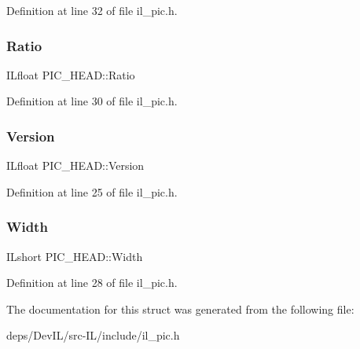 Definition at line 32 of file il\+\_\+pic.\+h.

\mbox{\label{structPIC__HEAD_a7a652ad020d931f870440df402b4ff13}} 
\subsubsection{\texorpdfstring{Ratio}{Ratio}}
{\footnotesize\ttfamily I\+Lfloat P\+I\+C\+\_\+\+H\+E\+A\+D\+::\+Ratio}



Definition at line 30 of file il\+\_\+pic.\+h.

\mbox{\label{structPIC__HEAD_a96bec33e36f9af928b4fd6b42a503637}} 
\subsubsection{\texorpdfstring{Version}{Version}}
{\footnotesize\ttfamily I\+Lfloat P\+I\+C\+\_\+\+H\+E\+A\+D\+::\+Version}



Definition at line 25 of file il\+\_\+pic.\+h.

\mbox{\label{structPIC__HEAD_af30a99863cc47a4923a7e6ee70f8ffc4}} 
\subsubsection{\texorpdfstring{Width}{Width}}
{\footnotesize\ttfamily I\+Lshort P\+I\+C\+\_\+\+H\+E\+A\+D\+::\+Width}



Definition at line 28 of file il\+\_\+pic.\+h.



The documentation for this struct was generated from the following file\+:\begin{DoxyCompactItemize}
\item 
deps/\+Dev\+I\+L/src-\/\+I\+L/include/il\+\_\+pic.\+h\end{DoxyCompactItemize}
